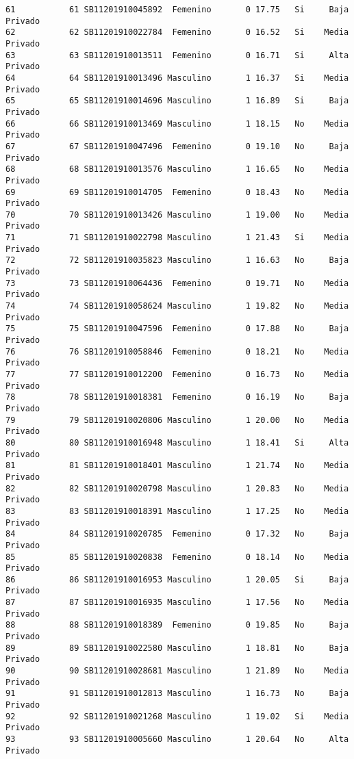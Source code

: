 \documentclass[
  letterpaper,
  DIV=11,
  numbers=noendperiod]{scrartcl}
\begin{document}
\begin{verbatim}
61           61 SB11201910045892  Femenino       0 17.75   Si     Baja Privado
62           62 SB11201910022784  Femenino       0 16.52   Si    Media Privado
63           63 SB11201910013511  Femenino       0 16.71   Si     Alta Privado
64           64 SB11201910013496 Masculino       1 16.37   Si    Media Privado
65           65 SB11201910014696 Masculino       1 16.89   Si     Baja Privado
66           66 SB11201910013469 Masculino       1 18.15   No    Media Privado
67           67 SB11201910047496  Femenino       0 19.10   No     Baja Privado
68           68 SB11201910013576 Masculino       1 16.65   No    Media Privado
69           69 SB11201910014705  Femenino       0 18.43   No    Media Privado
70           70 SB11201910013426 Masculino       1 19.00   No    Media Privado
71           71 SB11201910022798 Masculino       1 21.43   Si    Media Privado
72           72 SB11201910035823 Masculino       1 16.63   No     Baja Privado
73           73 SB11201910064436  Femenino       0 19.71   No    Media Privado
74           74 SB11201910058624 Masculino       1 19.82   No    Media Privado
75           75 SB11201910047596  Femenino       0 17.88   No     Baja Privado
76           76 SB11201910058846  Femenino       0 18.21   No    Media Privado
77           77 SB11201910012200  Femenino       0 16.73   No    Media Privado
78           78 SB11201910018381  Femenino       0 16.19   No     Baja Privado
79           79 SB11201910020806 Masculino       1 20.00   No    Media Privado
80           80 SB11201910016948 Masculino       1 18.41   Si     Alta Privado
81           81 SB11201910018401 Masculino       1 21.74   No    Media Privado
82           82 SB11201910020798 Masculino       1 20.83   No    Media Privado
83           83 SB11201910018391 Masculino       1 17.25   No    Media Privado
84           84 SB11201910020785  Femenino       0 17.32   No     Baja Privado
85           85 SB11201910020838  Femenino       0 18.14   No    Media Privado
86           86 SB11201910016953 Masculino       1 20.05   Si     Baja Privado
87           87 SB11201910016935 Masculino       1 17.56   No    Media Privado
88           88 SB11201910018389  Femenino       0 19.85   No     Baja Privado
89           89 SB11201910022580 Masculino       1 18.81   No     Baja Privado
90           90 SB11201910028681 Masculino       1 21.89   No    Media Privado
91           91 SB11201910012813 Masculino       1 16.73   No     Baja Privado
92           92 SB11201910021268 Masculino       1 19.02   Si    Media Privado
93           93 SB11201910005660 Masculino       1 20.64   No     Alta Privado

\end{verbatim}
\end{document}
